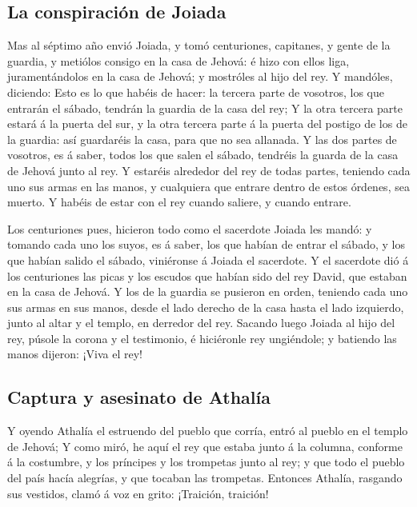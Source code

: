 \hypertarget{la-conspiraciuxf3n-de-joiada}{%
\subsection{La conspiración de
Joiada}\label{la-conspiraciuxf3n-de-joiada}}

 Mas al séptimo año envió Joiada, y tomó centuriones,
capitanes, y gente de la guardia, y metiólos consigo en la casa de
Jehová: é hizo con ellos liga, juramentándolos en la casa de Jehová; y
mostróles al hijo del rey.  Y mandóles, diciendo: Esto es lo
que habéis de hacer: la tercera parte de vosotros, los que entrarán el
sábado, tendrán la guardia de la casa del rey;  Y la otra
tercera parte estará á la puerta del sur, y la otra tercera parte á la
puerta del postigo de los de la guardia: así guardaréis la casa, para
que no sea allanada.  Y las dos partes de vosotros, es á
saber, todos los que salen el sábado, tendréis la guarda de la casa de
Jehová junto al rey.  Y estaréis alrededor del rey de todas
partes, teniendo cada uno sus armas en las manos, y cualquiera que
entrare dentro de estos órdenes, sea muerto. Y habéis de estar con el
rey cuando saliere, y cuando entrare.

 Los centuriones pues, hicieron todo como el sacerdote
Joiada les mandó: y tomando cada uno los suyos, es á saber, los que
habían de entrar el sábado, y los que habían salido el sábado,
viniéronse á Joiada el sacerdote.  Y el sacerdote dió á los
centuriones las picas y los escudos que habían sido del rey David, que
estaban en la casa de Jehová.  Y los de la guardia se
pusieron en orden, teniendo cada uno sus armas en sus manos, desde el
lado derecho de la casa hasta el lado izquierdo, junto al altar y el
templo, en derredor del rey.  Sacando luego Joiada al hijo
del rey, púsole la corona y el testimonio, é hiciéronle rey ungiéndole;
y batiendo las manos dijeron: ¡Viva el rey!

\hypertarget{captura-y-asesinato-de-athaluxeda}{%
\subsection{Captura y asesinato de
Athalía}\label{captura-y-asesinato-de-athaluxeda}}

 Y oyendo Athalía el estruendo del pueblo que corría, entró
al pueblo en el templo de Jehová;  Y como miró, he aquí el
rey que estaba junto á la columna, conforme á la costumbre, y los
príncipes y los trompetas junto al rey; y que todo el pueblo del país
hacía alegrías, y que tocaban las trompetas. Entonces Athalía, rasgando
sus vestidos, clamó á voz en grito: ¡Traición, traición!

